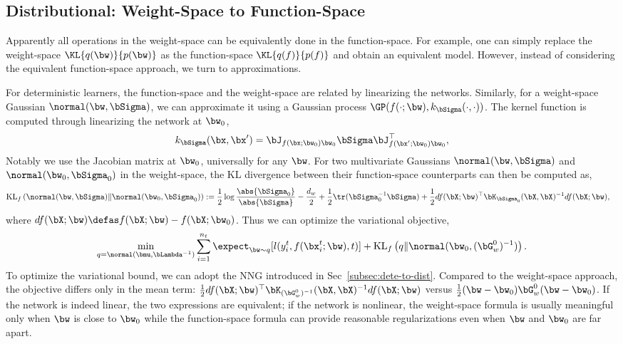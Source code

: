 \subsection{Distributional: Weight-Space to Function-Space}
Apparently all operations in the weight-space can be equivalently done in the function-space. For example, one can simply replace the weight-space $\KL{q(\bw)}{p(\bw)}$ as the function-space $\KL{q(f)}{p(f)}$ and obtain an equivalent model. However, instead of considering the equivalent function-space approach, we turn to approximations.

For deterministic learners, the function-space and the weight-space are related by linearizing the networks. Similarly, for a weight-space Gaussian $\normal(\bw, \bSigma)$, we can approximate it using a Gaussian process $\GP(f(\cdot; \bw), k_{\bSigma}(\cdot, \cdot))$. The kernel function is computed through linearizing the network at $\bw_0$,
\begin{align}
    k_{\bSigma}(\bx, \bx') = \bJ_{f(\bx; \bw_0) \bw_0} \bSigma \bJ_{f(\bx'; \bw_0) \bw_0}^{\top},
\end{align}
Notably we use the Jacobian matrix at $\bw_0$, universally for any $\bw$. For two multivariate Gaussians $\normal(\bw, \bSigma)$ and $\normal(\bw_0, \bSigma_0)$ in the weight-space, the KL divergence between their function-space counterparts can then be computed as,
\begin{align}
    \mathrm{KL}_f\left({\normal(\bw, \bSigma)}\|{\normal(\bw_0, \bSigma_0)}\right) & := \frac{1}{2}\log \frac{\abs{\bSigma_0}}{\abs{\bSigma}} - \frac{d_{w}}{2} + \frac{1}{2}\tr(\bSigma_0^{-1}\bSigma)  + \frac{1}{2}df(\bX; \bw)^{\top} \bK_{\bSigma_0}(\bX, \bX)^{-1} df(\bX; \bw), \notag
\end{align}
where $df(\bX; \bw)\defas f(\bX; \bw) - f(\bX; \bw_0)$.
Thus we can optimize the variational objective,
\begin{align}\label{eq:eq-kl-f}
    \min_{q = \normal(\bmu, \bLambda^{-1})} \sum_{i=1}^{n_t} \expect_{\bw \sim q}[l(y_i^t, f(\bx_i^t; \bw), t)] + 
    \mathrm{KL}_f\left({q}\|{\normal(\bw_0, (\bG_{w}^0)^{-1})}\right).
\end{align}
To optimize the variational bound, we can adopt the NNG introduced in Sec~\ref{subsec:dete-to-dist}. Compared to the weight-space approach, the objective differs only in the mean term: $\frac{1}{2}df(\bX; \bw)^{\top} \bK_{(\bG_{w}^0)^{-1}}(\bX, \bX)^{-1} df(\bX; \bw) $ versus $\frac{1}{2}(\bw-\bw_0) \bG_{w}^0 (\bw - \bw_0)$. If the network is indeed linear, the two expressions are equivalent; if the network is nonlinear, the weight-space formula is usually meaningful only when $\bw$ is close to $\bw_0$ while the function-space formula can provide reasonable regularizations even when $\bw$ and $\bw_0$ are far apart.

